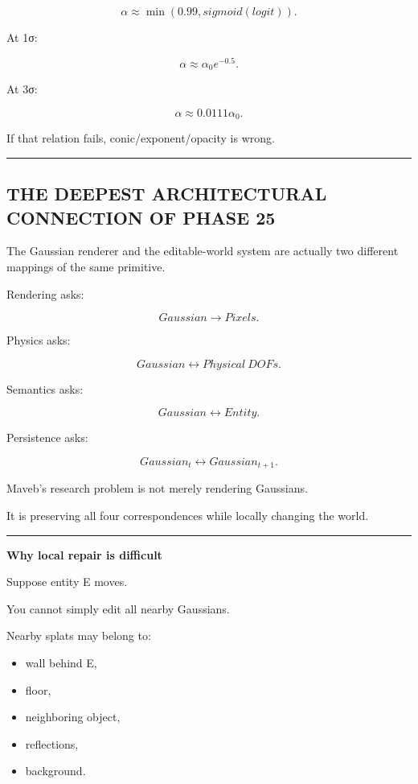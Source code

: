 \[
\alpha\approx
\min(
0.99,
sigmoid(logit)).
\]

At 1σ:

\[
\alpha
\approx
\alpha_0e^{-0.5}.
\]

At 3σ:

\[
\alpha
\approx
0.0111\alpha_0.
\]

If that relation fails, conic/exponent/opacity is wrong.

\begin{center}\rule{0.5\linewidth}{0.5pt}\end{center}

\subsection{THE DEEPEST ARCHITECTURAL CONNECTION OF PHASE 25}\label{06-engine-ii-ch045-the-deepest-architectural-connection-of-phase-25}

\hypertarget{06-engine-ii-ch045-the-deepest-architectural-connection-of-phase-25}{}

The Gaussian renderer and the editable-world system are actually two different mappings of the same primitive.

Rendering asks:

\[
\boxed{
Gaussian
\rightarrow
Pixels.
}
\]

Physics asks:

\[
\boxed{
Gaussian
\leftrightarrow
Physical\ DOFs.
}
\]

Semantics asks:

\[
\boxed{
Gaussian
\leftrightarrow
Entity.
}
\]

Persistence asks:

\[
\boxed{
Gaussian_t
\leftrightarrow
Gaussian_{t+1}.
}
\]

Maveb's research problem is not merely rendering Gaussians.

It is preserving all four correspondences while locally changing the world.

\begin{center}\rule{0.5\linewidth}{0.5pt}\end{center}

\textbf{Why local repair is difficult}

Suppose entity E moves.

You cannot simply edit all nearby Gaussians.

Nearby splats may belong to:

\begin{itemize}
\tightlist
\item
  wall behind E,
\item
  floor,
\item
  neighboring object,
\item
  reflections,
\item
  background.
\end{itemize}

